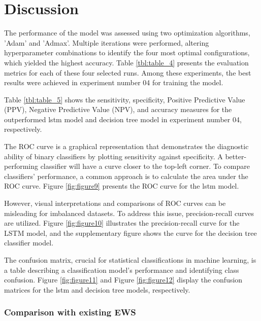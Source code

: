 \documentclass[journal,article,submit,pdftex,moreauthors]{Definitions/mdpi}
\begin{document}

\section{Discussion}

The performance of the model was assessed using two optimization algorithms, 'Adam' and 'Admax'. Multiple iterations were performed, altering hyperparameter combinations to identify the four most optimal configurations, which yielded the highest accuracy. Table \ref{tbl:table_4} presents the evaluation metrics for each of these four selected runs. Among these experiments, the best results were achieved in experiment number 04 for training the model.



Table \ref{tbl:table_5} shows the sensitivity, specificity, Positive Predictive Value (PPV), Negative Predictive Value (NPV), and accuracy measures for the outperformed \gls{lstm} model and decision tree model in experiment number 04, respectively.



The ROC curve is a graphical representation that demonstrates the diagnostic ability of binary classifiers by plotting sensitivity against specificity. A better-performing classifier will have a curve closer to the top-left corner. To compare classifiers' performance, a common approach is to calculate the area under the ROC curve. Figure \ref{fig:figure9} presents the ROC curve for the \gls{lstm} model.

However, visual interpretations and comparisons of ROC curves can be misleading for imbalanced datasets. To address this issue, precision-recall curves are utilized. Figure \ref{fig:figure10} illustrates the precision-recall curve for the LSTM model, and the supplementary figure shows the curve for the decision tree classifier model.



The confusion matrix, crucial for statistical classifications in machine learning, is a table describing a classification model's performance and identifying class confusion. Figure \ref{fig:figure11} and Figure \ref{fig:figure12} display the confusion matrices for the \gls{lstm} and decision tree models, respectively.




\subsubsection{Comparison with existing EWS}
 
\end{document}
